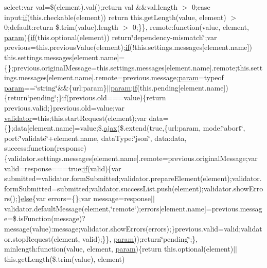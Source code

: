\begin{DoxyCompactItemize}
\textquotesingle{}select\textquotesingle{}\+:var val=\$(element).val();return val \&\&val.\+length $>$ 0;case \textquotesingle{}input\textquotesingle{}\+:\hyperlink{_scripts_2respond_8min_8js_a93851d60dd037a83509a1757b9ee7b66}{if}(this.\+checkable(element)) return this.\+get\+Length(value, element) $>$ 0;default\+:return \$.trim(value).length $>$ 0;\}\}, remote\+:function(value, element, \hyperlink{_scripts_2jquery-1_810_82_8min_8js_ae8915303d11557d1b001bc56b6195251}{param})\{\hyperlink{_scripts_2respond_8min_8js_a93851d60dd037a83509a1757b9ee7b66}{if}(this.\+optional(element)) return\char`\"{}dependency-\/mismatch\char`\"{};var previous=this.\+previous\+Value(element);\hyperlink{_scripts_2respond_8min_8js_a93851d60dd037a83509a1757b9ee7b66}{if}(!this.\+settings.\+messages\mbox{[}element.\+name\mbox{]}) this.\+settings.\+messages\mbox{[}element.\+name\mbox{]}=\{\};previous.\+original\+Message=this.\+settings.\+messages\mbox{[}element.\+name\mbox{]}.remote;this.\+settings.\+messages\mbox{[}element.\+name\mbox{]}.remote=previous.\+message;\hyperlink{_scripts_2jquery-1_810_82_8min_8js_ae8915303d11557d1b001bc56b6195251}{param}=typeof \hyperlink{_scripts_2jquery-1_810_82_8min_8js_ae8915303d11557d1b001bc56b6195251}{param}==\char`\"{}string\char`\"{}\&\&\{url\+:param\}$\vert$$\vert$\hyperlink{_scripts_2jquery-1_810_82_8min_8js_ae8915303d11557d1b001bc56b6195251}{param};\hyperlink{_scripts_2respond_8min_8js_a93851d60dd037a83509a1757b9ee7b66}{if}(this.\+pending\mbox{[}element.\+name\mbox{]})\{return\char`\"{}pending\char`\"{};\}if(previous.\+old===value)\{return previous.\+valid;\}previous.\+old=value;var \hyperlink{_scripts_2jquery_8validate_8js_a2dc8272bb221cdffcccbd20db038f172}{validator}=this;this.\+start\+Request(element);var data=\{\};data\mbox{[}element.\+name\mbox{]}=value;\$.\hyperlink{_scripts_2jquery_8validate_8js_a77004c0fdc08a5bc07afa0b099cdf6df}{ajax}(\$.extend(true,\{url\+:param, mode\+:\char`\"{}abort\char`\"{}, port\+:\char`\"{}validate\char`\"{}+element.\+name, data\+Type\+:\char`\"{}json\char`\"{}, data\+:data, success\+:function(response)\{validator.\+settings.\+messages\mbox{[}element.\+name\mbox{]}.remote=previous.\+original\+Message;var valid=response===true;\hyperlink{_scripts_2respond_8min_8js_a93851d60dd037a83509a1757b9ee7b66}{if}(valid)\{var submitted=validator.\+form\+Submitted;validator.\+prepare\+Element(element);validator.\+form\+Submitted=submitted;validator.\+success\+List.\+push(element);validator.\+show\+Errors();\}\hyperlink{_scripts_2jquery_8validate_8js_a0544c3fe466e421738dae463968b70ba}{else}\{var errors=\{\};var message=response$\vert$$\vert$validator.\+default\+Message(element,\char`\"{}remote\char`\"{});errors\mbox{[}element.\+name\mbox{]}=previous.\+message=\$.is\+Function(message)?message(value)\+:message;validator.\+show\+Errors(errors);\}previous.\+valid=valid;validator.\+stop\+Request(element, valid);\}\}, \hyperlink{_scripts_2jquery-1_810_82_8min_8js_ae8915303d11557d1b001bc56b6195251}{param}));return\char`\"{}pending\char`\"{};\}, minlength\+:function(value, element, \hyperlink{_scripts_2jquery-1_810_82_8min_8js_ae8915303d11557d1b001bc56b6195251}{param})\{return this.\+optional(element)$\vert$$\vert$this.\+get\+Length(\$.trim(value), element) 
\end{DoxyCompactItemize}
